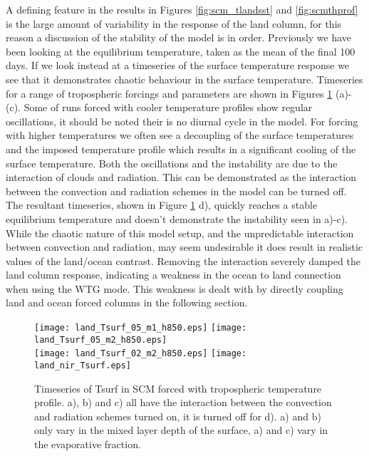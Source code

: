A defining feature in the results in Figures \ref{fig:scm_tlandsst} and 
\ref{fig:scmthprof} is the large amount of variability in the response of the 
land column, for this reason a discussion of the stability of the model is in 
order. Previously we have been looking at the equilibrium temperature, taken as 
the mean of the final 100 days. If we look instead at a timeseries of the 
surface temperature response we see that it demonstrates chaotic behaviour in 
the surface temperature. Timeseries for a range of tropospheric forcings and 
parameters are shown in Figures \ref{fig:scmts} (a)-(c). Some of runs forced 
with cooler temperature profiles show regular oscillations, it should be noted 
their is no diurnal cycle in the model.  For forcing with higher temperatures we 
often see a decoupling of the surface temperatures and the imposed temperature 
profile which results in a significant cooling of the surface temperature.  Both 
the oscillations and the instability are due to the interaction of clouds and 
radiation. This can be demonstrated as the interaction between the convection 
and radiation schemes in the model can be turned off. The resultant timeseries, 
shown in Figure \ref{fig:scmts} d), quickly reaches a stable equilibrium 
temperature and doesn't demonstrate the instability seen in a)-c). While the 
chaotic nature of this model setup, and the unpredictable interaction between 
convection and radiation, may seem undesirable it does result in realistic 
values of the land/ocean contrast. Removing the interaction severely damped the 
land column response, indicating a weakness in the ocean to land connection when 
using the WTG mode. This weakness is dealt with by directly coupling land and 
ocean forced columns in the following section.

\begin{figure}[ht]
\texttt{[image: land\_Tsurf\_05\_m1\_h850.eps]}
\texttt{[image: land\_Tsurf\_05\_m2\_h850.eps]}\\
\texttt{[image: land\_Tsurf\_02\_m2\_h850.eps]}
\texttt{[image: land\_nir\_Tsurf.eps]}\\
\caption{Timeseries of Tsurf in SCM forced with tropospheric temperature 
profile. a), b) and c) all have the interaction between the convection and 
radiation schemes turned on, it is turned off for d). a) and b) only vary in the 
mixed layer depth of the surface, a) and c) vary in the evaporative fraction.}
\label{fig:scmts}
\end{figure}

